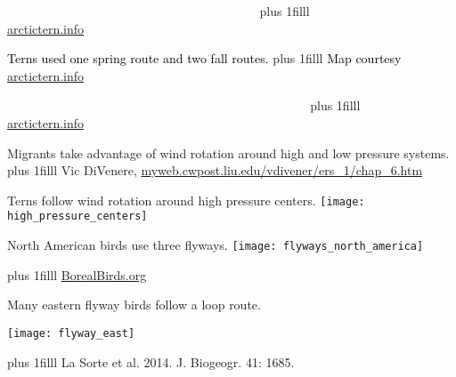 \documentclass[t]{beamer}
\newcommand\imagecredit[1]{%
	\vskip0pt plus 1filll \tiny #1}%
\begin{document}
{
\begin{frame}[t,plain]{\textcolor{white}{The Arctic Tern also migrates long distances.}}
	\imagecredit{\hfill\textcolor{white}{ Carsten Egevang, \url{arctictern.info}}}
\end{frame}
}

{
\begin{frame}[t,plain]{\textcolor{black}{Terns used one spring route and two fall routes.}}
	\imagecredit{\hfill\textcolor{black}{ Map courtesy \url{arctictern.info}}}
\end{frame}
}

{
\begin{frame}[t,plain]{\textcolor{white}{Can you explain why Arctic Terns follow these routes?}}
	\imagecredit{\hfill\textcolor{white}{ Map courtesy \url{arctictern.info}}}
\end{frame}
}

{
\begin{frame}[t,plain]{Migrants take advantage of wind rotation around high and low pressure systems.}
	\imagecredit{\hfill Vic DiVenere, \url{myweb.cwpost.liu.edu/vdivener/ers_1/chap_6.htm}}
\end{frame}
}


{
\begin{frame}[t,plain]{Terns follow wind rotation around high pressure centers.}
	\centering
		\texttt{[image: high\_pressure\_centers]}
\end{frame}
}


{
\begin{frame}[t,plain]{North American birds use three flyways.}
	\centering
		\texttt{[image: flyways\_north\_america]}
		
	\imagecredit{\hfill \href{http://borealbirds.org/boreal-bird-migrations}{BorealBirds.org}}
\end{frame}
}


{
\begin{frame}[t,plain]{Many eastern flyway birds follow a loop route.}
	\begin{center}
		\texttt{[image: flyway\_east]}
	\end{center}
		
	\imagecredit{\hfill La Sorte et al. 2014. J. Biogeogr. 41: 1685.}
\end{frame}
}
\end{document}
